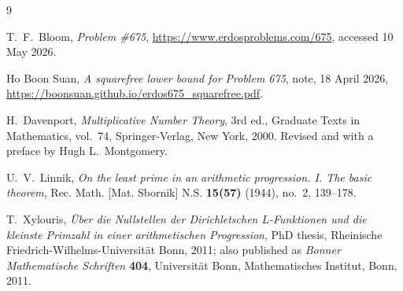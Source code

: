 \documentclass{amsart}
\begin{document}
\begin{thebibliography}{9}

T.~F.~Bloom,
\emph{\Erdos Problem \#675},
\url{https://www.erdosproblems.com/675},
accessed 10 May 2026.

Ho Boon Suan,
\emph{A squarefree lower bound for \Erdos Problem 675},
note, 18 April 2026,
\url{https://boonsuan.github.io/erdos675_squarefree.pdf}.

H.~Davenport,
\emph{Multiplicative Number Theory}, 3rd ed.,
Graduate Texts in Mathematics, vol.~74, Springer-Verlag, New York, 2000.
Revised and with a preface by Hugh L.~Montgomery.

U.~V.~Linnik,
\emph{On the least prime in an arithmetic progression. I. The basic theorem},
Rec. Math. [Mat. Sbornik] N.S. \textbf{15(57)} (1944), no.~2, 139--178.

T.~Xylouris,
\emph{\"{U}ber die Nullstellen der Dirichletschen $L$-Funktionen und die kleinste Primzahl in einer arithmetischen Progression},
PhD thesis, Rheinische Friedrich-Wilhelms-Universit\"{a}t Bonn, 2011;
also published as \emph{Bonner Mathematische Schriften} \textbf{404}, Universit\"{a}t Bonn, Mathematisches Institut, Bonn, 2011.

\end{thebibliography}
\end{document}
